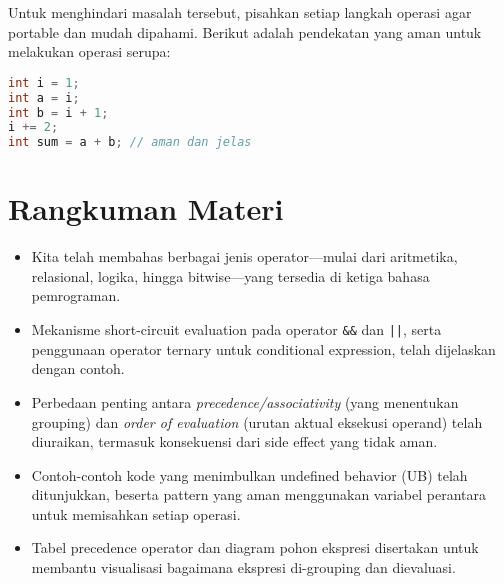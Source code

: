 \documentclass[../main.tex]{subfiles}
\begin{document}
Untuk menghindari masalah tersebut, pisahkan setiap langkah operasi agar portable dan mudah dipahami. Berikut adalah pendekatan yang aman untuk melakukan operasi serupa:

\begin{lstlisting}[language=C]
int i = 1;
int a = i;
int b = i + 1;
i += 2;
int sum = a + b; // aman dan jelas
\end{lstlisting}

\section{Rangkuman Materi}
\begin{itemize}
  \item Kita telah membahas berbagai jenis operator—mulai dari aritmetika, relasional, logika, hingga bitwise—yang tersedia di ketiga bahasa pemrograman.
  \item Mekanisme short-circuit evaluation pada operator \texttt{\&\&} dan \texttt{||}, serta penggunaan operator ternary untuk conditional expression, telah dijelaskan dengan contoh.
  \item Perbedaan penting antara \emph{precedence/associativity} (yang menentukan grouping) dan \emph{order of evaluation} (urutan aktual eksekusi operand) telah diuraikan, termasuk konsekuensi dari side effect yang tidak aman.
  \item Contoh-contoh kode yang menimbulkan undefined behavior (UB) telah ditunjukkan, beserta pattern yang aman menggunakan variabel perantara untuk memisahkan setiap operasi.
  \item Tabel precedence operator dan diagram pohon ekspresi disertakan untuk membantu visualisasi bagaimana ekspresi di-grouping dan dievaluasi.
\end{itemize}
\end{document}
